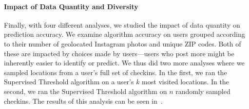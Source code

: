 \paragraph{Impact of Data Quantity and Diversity}
Finally, with four different analyses, we studied the impact of data quantity on prediction accuracy.
We examine algorithm accuracy on users grouped according to their number of geolocated Instagram photos and unique ZIP codes.
Both of these are impacted by choices made by users---users who post more might be inherently easier to identify or predict.
We thus did two more analyses where we sampled locations from a user's full set of checkins.
In the first, we ran the Supervised Threshold algorithm on a user's $k$ most visited locations.
In the second, we ran the Supervised Threshold algorithm on $n$ randomly sampled checkins.
The results of this analysis can be seen in~.



